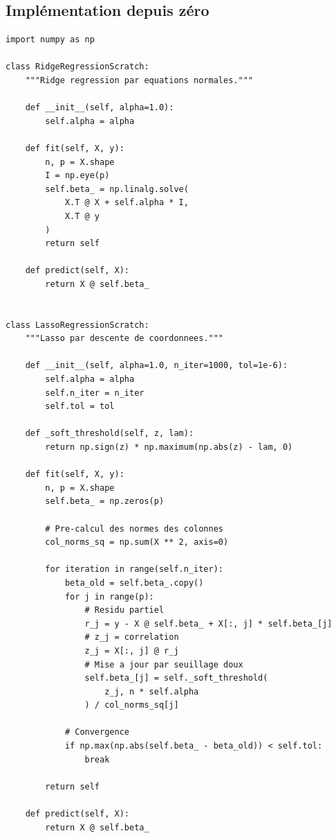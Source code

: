 \subsection{Impl\'ementation depuis z\'ero}

\begin{codeblock}[title=\textbf{Ridge et Lasso depuis z\'ero}]
\begin{verbatim}
import numpy as np

class RidgeRegressionScratch:
    """Ridge regression par equations normales."""

    def __init__(self, alpha=1.0):
        self.alpha = alpha

    def fit(self, X, y):
        n, p = X.shape
        I = np.eye(p)
        self.beta_ = np.linalg.solve(
            X.T @ X + self.alpha * I,
            X.T @ y
        )
        return self

    def predict(self, X):
        return X @ self.beta_


class LassoRegressionScratch:
    """Lasso par descente de coordonnees."""

    def __init__(self, alpha=1.0, n_iter=1000, tol=1e-6):
        self.alpha = alpha
        self.n_iter = n_iter
        self.tol = tol

    def _soft_threshold(self, z, lam):
        return np.sign(z) * np.maximum(np.abs(z) - lam, 0)

    def fit(self, X, y):
        n, p = X.shape
        self.beta_ = np.zeros(p)

        # Pre-calcul des normes des colonnes
        col_norms_sq = np.sum(X ** 2, axis=0)

        for iteration in range(self.n_iter):
            beta_old = self.beta_.copy()
            for j in range(p):
                # Residu partiel
                r_j = y - X @ self.beta_ + X[:, j] * self.beta_[j]
                # z_j = correlation
                z_j = X[:, j] @ r_j
                # Mise a jour par seuillage doux
                self.beta_[j] = self._soft_threshold(
                    z_j, n * self.alpha
                ) / col_norms_sq[j]

            # Convergence
            if np.max(np.abs(self.beta_ - beta_old)) < self.tol:
                break

        return self

    def predict(self, X):
        return X @ self.beta_
\end{verbatim}
\end{codeblock}

